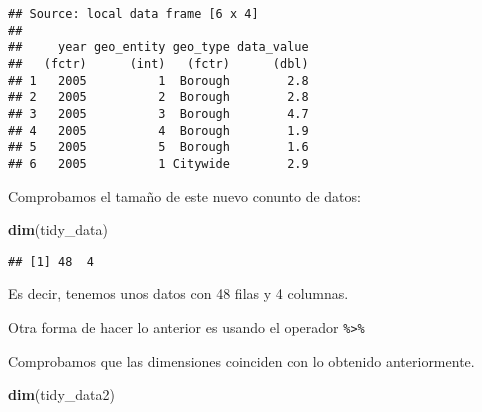 \documentclass[12pt,spanish,]{article}
\newenvironment{Shaded}{\begin{snugshade}}{\end{snugshade}}
\newcommand{\KeywordTok}[1]{\textcolor[rgb]{0.13,0.29,0.53}{\textbf{{#1}}}}
\newcommand{\DataTypeTok}[1]{\textcolor[rgb]{0.13,0.29,0.53}{{#1}}}
\newcommand{\DecValTok}[1]{\textcolor[rgb]{0.00,0.00,0.81}{{#1}}}
\newcommand{\StringTok}[1]{\textcolor[rgb]{0.31,0.60,0.02}{{#1}}}
\newcommand{\NormalTok}[1]{{#1}}
\begin{document}
\begin{verbatim}
## Source: local data frame [6 x 4]
## 
##     year geo_entity geo_type data_value
##   (fctr)      (int)   (fctr)      (dbl)
## 1   2005          1  Borough        2.8
## 2   2005          2  Borough        2.8
## 3   2005          3  Borough        4.7
## 4   2005          4  Borough        1.9
## 5   2005          5  Borough        1.6
## 6   2005          1 Citywide        2.9
\end{verbatim}

Comprobamos el tamaño de este nuevo conunto de datos:

\begin{Shaded}
\begin{Highlighting}[]
\KeywordTok{dim}\NormalTok{(tidy_data)}
\end{Highlighting}
\end{Shaded}

\begin{verbatim}
## [1] 48  4
\end{verbatim}

Es decir, tenemos unos datos con 48 filas y 4 columnas.

Otra forma de hacer lo anterior es usando el operador
\texttt{\%\textgreater{}\%}

\begin{Shaded}
\end{Shaded}

Comprobamos que las dimensiones coinciden con lo obtenido anteriormente.

\begin{Shaded}
\begin{Highlighting}[]
\KeywordTok{dim}\NormalTok{(tidy_data2)}
\end{Highlighting}
\end{Shaded}
\end{document}
